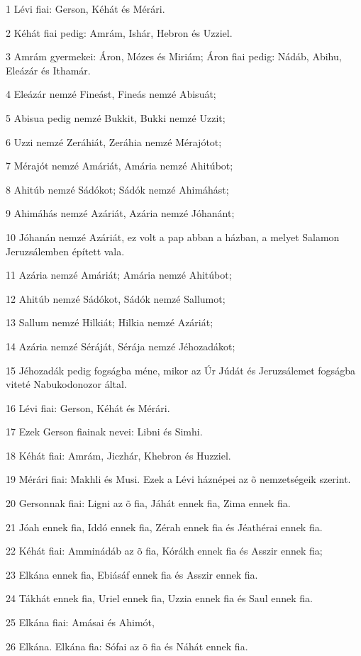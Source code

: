 \par 1 Lévi fiai: Gerson, Kéhát és Mérári.
\par 2 Kéhát fiai pedig: Amrám, Ishár, Hebron és Uzziel.
\par 3 Amrám gyermekei: Áron, Mózes és Miriám; Áron fiai pedig: Nádáb,  Abihu, Eleázár és Ithamár.
\par 4 Eleázár nemzé Fineást, Fineás nemzé Abisuát;
\par 5 Abisua pedig nemzé Bukkit, Bukki nemzé Uzzit;
\par 6 Uzzi nemzé Zeráhiát, Zeráhia nemzé Mérajótot;
\par 7 Mérajót nemzé Amáriát, Amária nemzé Ahitúbot;
\par 8 Ahitúb nemzé Sádókot;  Sádók nemzé Ahimáhást;
\par 9 Ahimáhás nemzé Azáriát, Azária nemzé Jóhanánt;
\par 10 Jóhanán nemzé Azáriát, ez volt a pap abban a házban, a melyet Salamon Jeruzsálemben épített vala.
\par 11 Azária nemzé Amáriát; Amária nemzé Ahitúbot;
\par 12 Ahitúb nemzé Sádókot, Sádók nemzé Sallumot;
\par 13 Sallum nemzé Hilkiát; Hilkia nemzé Azáriát;
\par 14 Azária nemzé Séráját, Sérája nemzé Jéhozadákot;
\par 15 Jéhozadák pedig fogságba méne, mikor az Úr Júdát és Jeruzsálemet fogságba viteté Nabukodonozor által.
\par 16 Lévi fiai: Gerson, Kéhát és Mérári.
\par 17 Ezek Gerson fiainak nevei: Libni és Simhi.
\par 18 Kéhát fiai: Amrám, Jiczhár, Khebron és Huzziel.
\par 19 Mérári fiai: Makhli és Musi. Ezek a Lévi háznépei az õ nemzetségeik szerint.
\par 20 Gersonnak fiai: Ligni az õ fia, Jáhát ennek fia, Zima ennek fia.
\par 21 Jóah ennek fia, Iddó ennek fia, Zérah ennek fia és Jéathérai ennek fia.
\par 22 Kéhát fiai: Amminádáb az õ fia, Kórákh ennek fia és Asszir ennek fia;
\par 23 Elkána ennek fia, Ebiásáf ennek fia és Asszir ennek fia.
\par 24 Tákhát ennek fia, Uriel ennek fia, Uzzia ennek fia és Saul ennek fia.
\par 25 Elkána fiai: Amásai és Ahimót,
\par 26 Elkána. Elkána fia: Sófai az õ fia és Náhát ennek fia.
